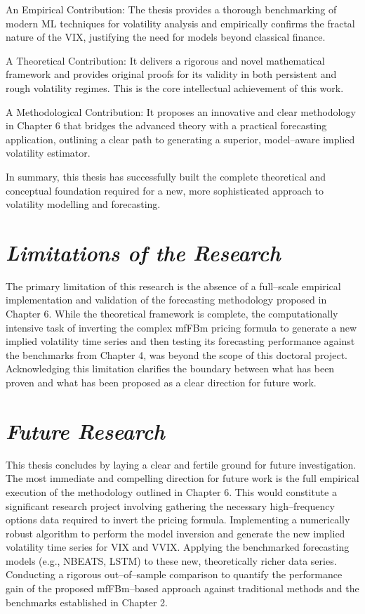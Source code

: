 \documentclass[12pt,a4paper]{report}
\numberwithin{equation}{section}
\begin{document}
An Empirical Contribution: The thesis provides a thorough benchmarking
of modern ML techniques for volatility analysis and empirically confirms
the fractal nature of the VIX, justifying the need for models beyond
classical finance.

A Theoretical Contribution: It delivers a rigorous and novel
mathematical framework and provides original proofs for its validity in
both persistent and rough volatility regimes. This is the core
intellectual achievement of this work.

A Methodological Contribution: It proposes an innovative and clear
methodology in Chapter 6 that bridges the advanced theory with a
practical forecasting application, outlining a clear path to generating
a superior, model--aware implied volatility estimator.

In summary, this thesis has successfully built the complete theoretical
and conceptual foundation required for a new, more sophisticated
approach to volatility modelling and forecasting.

\hypertarget{limitations--of--the--research}{%
\section{\texorpdfstring{\emph{\textbf{Limitations of the
Research}}}{Limitations of the Research}}\label{limitations--of--the--research}}

The primary limitation of this research is the absence of a full--scale
empirical implementation and validation of the forecasting methodology
proposed in Chapter 6. While the theoretical framework is complete, the
computationally intensive task of inverting the complex mfFBm pricing
formula to generate a new implied volatility time series and then
testing its forecasting performance against the benchmarks from Chapter
4, was beyond the scope of this doctoral project. Acknowledging this
limitation clarifies the boundary between what has been proven and what
has been proposed as a clear direction for future work.

\hypertarget{future--research}{%
\section{\texorpdfstring{\emph{\textbf{Future
Research}}}{Future Research}}\label{future--research}}

This thesis concludes by laying a clear and fertile ground for future
investigation. The most immediate and compelling direction for future
work is the full empirical execution of the methodology outlined in
Chapter 6. This would constitute a significant research project
involving gathering the necessary high--frequency options data required
to invert the pricing formula. Implementing a numerically robust
algorithm to perform the model inversion and generate the new implied
volatility time series for VIX and VVIX. Applying the benchmarked
forecasting models (e.g., NBEATS, LSTM) to these new, theoretically
richer data series. Conducting a rigorous out--of--sample comparison to
quantify the performance gain of the proposed mfFBm--based approach
against traditional methods and the benchmarks established in Chapter 2.
\end{document}
